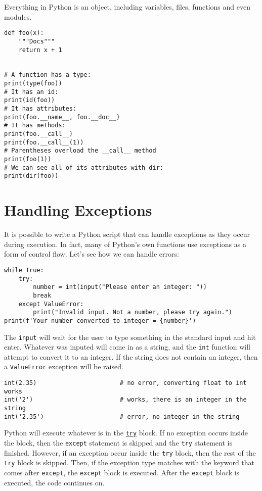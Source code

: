 \documentclass[12pt, a4paper]{article}
\begin{document}
Everything in Python is an object, including variables, files, functions and even modules.
\lstset{language=jupyter-python,label= ,caption= ,captionpos=b,numbers=none}
\begin{lstlisting}
def foo(x):
    """Docs"""
    return x + 1


# A function has a type:
print(type(foo))
# It has an id:
print(id(foo))
# It has attributes:
print(foo.__name__, foo.__doc__)
# It has methods:
print(foo.__call__)
print(foo.__call__(1))
# Parentheses overload the __call__ method
print(foo(1))
# We can see all of its attributes with dir:
print(dir(foo))
\end{lstlisting}
\section{Handling Exceptions}
\label{sec:orgd6ef056}
It is possible to write a Python script that can handle exceptions as they occur during execution.
In fact, many of Python's own functions use exceptions as a form of control flow.
Let's see how we can handle errors:
\lstset{language=jupyter-python,label= ,caption= ,captionpos=b,numbers=none}
\begin{lstlisting}
while True:
    try:
        number = int(input("Please enter an integer: "))
        break
    except ValueError:
        print("Invalid input. Not a number, please try again.")
print(f'Your number converted to integer = {number}')
\end{lstlisting}

The \texttt{input} will wait for the user to type something in the standard input and hit enter.
Whatever was inputed will come in as a string, and the \texttt{int} function will attempt to convert it to an integer.
If the string does not contain an integer, then a \texttt{ValueError} exception will be raised.
\lstset{language=jupyter-python,label= ,caption= ,captionpos=b,numbers=none}
\begin{lstlisting}
int(2.35)                       # no error, converting float to int works
int('2')                        # works, there is an integer in the string
int('2.35')                     # error, no integer in the string
\end{lstlisting}

Python will execute whatever is in the \href{https://docs.python.org/3.6/tutorial/errors.html\#handling-exceptions}{\texttt{try}} block.
If no exception occurs inside the block, then the \texttt{except} statement is skipped and the \texttt{try} statement is finished.
However, if an exception occur inside the \texttt{try} block, then the rest of the \texttt{try} block is skipped.
Then, if the exception type matches with the keyword that comes after \texttt{except}, the \texttt{except} block is executed.
After the \texttt{except} block is executed, the code continues on.
\end{document}
